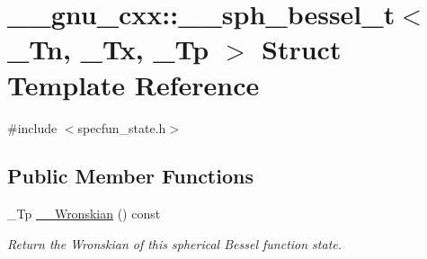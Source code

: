 \hypertarget{struct____gnu__cxx_1_1____sph__bessel__t}{}\section{\+\_\+\+\_\+gnu\+\_\+cxx\+:\+:\+\_\+\+\_\+sph\+\_\+bessel\+\_\+t$<$ \+\_\+\+Tn, \+\_\+\+Tx, \+\_\+\+Tp $>$ Struct Template Reference}
\label{struct____gnu__cxx_1_1____sph__bessel__t}


{\ttfamily \#include $<$specfun\+\_\+state.\+h$>$}

\subsection*{Public Member Functions}
\begin{DoxyCompactItemize}
\item 
\+\_\+\+Tp \hyperlink{struct____gnu__cxx_1_1____sph__bessel__t_aefdc67ff4bd4b74bf6337c2a5724849b}{\+\_\+\+\_\+\+Wronskian} () const
\begin{DoxyCompactList}\small\item\em Return the Wronskian of this spherical Bessel function state. \end{DoxyCompactList}\end{DoxyCompactItemize}
